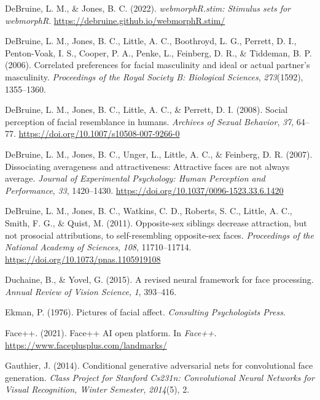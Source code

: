 \documentclass[
  man,floatsintext]{apa6}
\newlength{\cslhangindent}
\newlength{\cslentryspacingunit} %
\newenvironment{CSLReferences}[2] %
 {%
  \setlength{\parindent}{0pt}
  \ifodd #1
  \let\oldpar\par
  \def\par{\hangindent=\cslhangindent\oldpar}
  \fi
  \setlength{\parskip}{#2\cslentryspacingunit}
 }%
 {}
\begin{document}
\begin{CSLReferences}{1}{0}
\leavevmode{}%
DeBruine, L. M., \& Jones, B. C. (2022). \emph{{webmorphR.stim}: Stimulus sets for webmorphR}. \url{https://debruine.github.io/webmorphR.stim/}

\leavevmode{}%
DeBruine, L. M., Jones, B. C., Little, A. C., Boothroyd, L. G., Perrett, D. I., Penton-Voak, I. S., Cooper, P. A., Penke, L., Feinberg, D. R., \& Tiddeman, B. P. (2006). Correlated preferences for facial masculinity and ideal or actual partner's masculinity. \emph{Proceedings of the Royal Society B: Biological Sciences}, \emph{273}(1592), 1355--1360.

\leavevmode{}%
DeBruine, L. M., Jones, B. C., Little, A. C., \& Perrett, D. I. (2008). Social perception of facial resemblance in humans. \emph{Archives of Sexual Behavior}, \emph{37}, 64--77. \url{https://doi.org/10.1007/s10508-007-9266-0}

\leavevmode{}%
DeBruine, L. M., Jones, B. C., Unger, L., Little, A. C., \& Feinberg, D. R. (2007). Dissociating averageness and attractiveness: Attractive faces are not always average. \emph{Journal of Experimental Psychology: Human Perception and Performance}, \emph{33}, 1420--1430. \url{https://doi.org/10.1037/0096-1523.33.6.1420}

\leavevmode{}%
DeBruine, L. M., Jones, B. C., Watkins, C. D., Roberts, S. C., Little, A. C., Smith, F. G., \& Quist, M. (2011). Opposite-sex siblings decrease attraction, but not prosocial attributions, to self-resembling opposite-sex faces. \emph{Proceedings of the National Academy of Sciences}, \emph{108}, 11710--11714. \url{https://doi.org/10.1073/pnas.1105919108}

\leavevmode{}%
Duchaine, B., \& Yovel, G. (2015). A revised neural framework for face processing. \emph{Annual Review of Vision Science}, \emph{1}, 393--416.

\leavevmode{}%
Ekman, P. (1976). Pictures of facial affect. \emph{Consulting Psychologists Press}.

\leavevmode{}%
Face++. (2021). Face++ AI open platform. In \emph{Face++}. \url{https://www.faceplusplus.com/landmarks/}

\leavevmode{}%
Gauthier, J. (2014). Conditional generative adversarial nets for convolutional face generation. \emph{Class Project for Stanford Cs231n: Convolutional Neural Networks for Visual Recognition, Winter Semester}, \emph{2014}(5), 2.


\end{CSLReferences}
\end{document}
